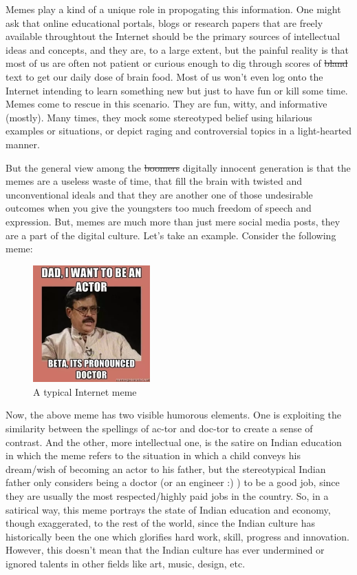 \def\DevnagVersion{2.17}\documentclass{article}
\begin{document}
Memes play a kind of a unique role in propogating this information. One might ask that online educational portals, blogs or research papers that are freely available throughtout the Internet should be the primary sources of intellectual ideas and concepts, and they are, to a large extent, but the painful reality is that most of us are often not patient or curious enough to dig through scores of \st{bland} text to get our daily dose of brain food. Most of us won't even log onto the Internet intending to learn something new but just to have fun or kill some time. Memes come to rescue in this scenario. They are fun, witty, and informative (mostly). Many times, they mock some stereotyped belief using hilarious examples or situations, or depict raging and controversial topics in a light-hearted manner.

But the general view among the \st{boomers} digitally innocent generation is that the memes are a useless waste of time, that fill the brain with twisted and unconventional ideals and that they are another one of those undesirable outcomes when you give the youngsters too much freedom of speech and expression. But, memes are much more than just mere social media posts, they are a part of the digital culture. Let's take an example. Consider the following meme:

\begin{figure}[H]
    \centering
    \includegraphics[width=0.4\textwidth]{figures/meme1.png}
    \caption{A typical Internet meme}
\end{figure}

Now, the above meme has two visible humorous elements. One is exploiting the similarity between the spellings of ac-tor and doc-tor to create a sense of contrast. And the other, more intellectual one, is the satire on Indian education in which the meme refers to the situation in which a child conveys his dream/wish of becoming an actor to his father, but the stereotypical Indian father only considers being a doctor (or an engineer :) ) to be a good job, since they are usually the most respected/highly paid jobs in the country. So, in a satirical way, this meme portrays the state of Indian education and economy, though exaggerated, to the rest of the world, since the Indian culture has historically been the one which glorifies hard work, skill, progress and innovation. However, this doesn't mean that the Indian culture has ever undermined or ignored talents in other fields like art, music, design, etc.
\end{document}
